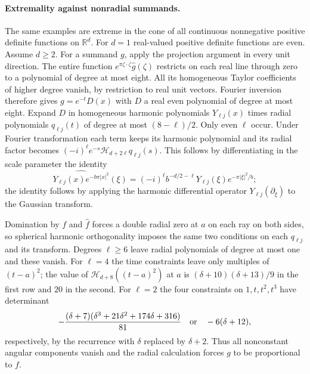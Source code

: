 \documentclass[11pt,a4paper]{article}
\numberwithin{equation}{section}
\begin{document}
\paragraph{Extremality against nonradial summands.}
The same examples are extreme in the cone of all continuous nonnegative
positive definite functions on $\mathbb R^d$. For $d=1$ real-valued
positive definite functions are even. Assume $d\ge2$. For a summand $g$,
apply the projection argument in every unit direction. The entire function
$e^{\pi\zeta\cdot\zeta}\widehat g(\zeta)$ restricts on each real line
through zero to a polynomial of degree at most eight. All its homogeneous
Taylor coefficients of higher degree vanish, by restriction to real unit
vectors. Fourier inversion therefore gives $g=e^{-t}D(x)$ with $D$ a
real even polynomial of degree at most eight.
Expand $D$ in homogeneous harmonic polynomials $Y_{\ell j}(x)$ times
radial polynomials $q_{\ell j}(t)$ of degree at most $(8-\ell)/2$.
Only even $\ell$ occur. Under Fourier transformation each term keeps
its harmonic polynomial and its radial factor becomes
$(-i)^\ell e^{-s}\mathcal H_{d+2\ell}q_{\ell j}(s)$.
This follows by differentiating in the scale parameter the identity
\[
 \widehat{Y_{\ell j}(x)e^{-b\pi|x|^2}}(\xi)
 =(-i)^\ell b^{-d/2-\ell}Y_{\ell j}(\xi)e^{-\pi|\xi|^2/b};
\]
the identity follows by applying the harmonic differential operator
$Y_{\ell j}(\partial_\xi)$ to the Gaussian transform.

Domination by $f$ and $\widehat f$ forces a double radial zero at $a$ on
each ray on both sides, so spherical harmonic orthogonality imposes the
same two conditions on each $q_{\ell j}$ and its transform.
Degrees $\ell\ge6$ leave radial polynomials of degree at most one and
these vanish. For $\ell=4$ the time constraints leave only multiples of
$(t-a)^2$; the value of $\mathcal H_{d+8}((t-a)^2)$ at $a$ is
$(\delta+10)(\delta+13)/9$ in the first row and $20$ in the second.
For $\ell=2$ the four constraints on $1,t,t^2,t^3$ have determinant
\[
 -\frac{(\delta+7)(\delta^3+21\delta^2+174\delta+316)}{81}
 \quad\hbox{or}\quad -6(\delta+12),
\]
respectively, by the recurrence with $\delta$ replaced by $\delta+2$.
Thus all nonconstant angular components vanish and the radial calculation
forces $g$ to be proportional to $f$.
\end{document}
